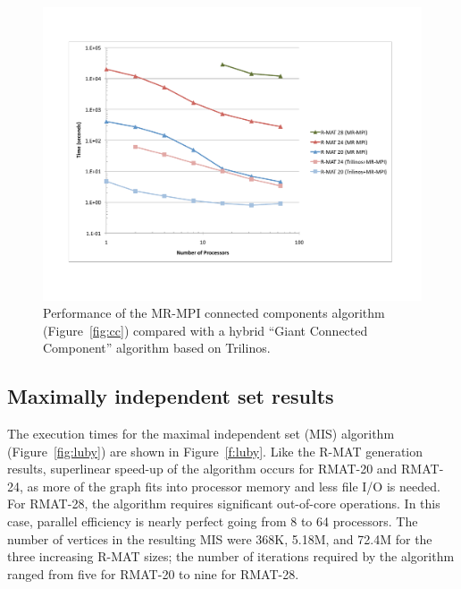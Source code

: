 \begin{figure}[htb]
\includegraphics[width=\textwidth]{fig_cc.pdf}
\caption{Performance of the MR-MPI connected components algorithm (Figure~\ref{fig:cc}) compared with a hybrid ``Giant Connected Component'' algorithm based
on Trilinos.}
\label{f:cc}
\end{figure}

\subsection{Maximally independent set results}

The execution times for the maximal independent set (MIS) algorithm
(Figure~\ref{fig:luby}) are shown in Figure~\ref{f:luby}.  Like the
R-MAT generation results, superlinear speed-up of the algorithm occurs
for RMAT-20 and RMAT-24, as more of the graph fits into processor
memory and less file I/O is needed.  For RMAT-28, the algorithm
requires significant out-of-core operations. In this case, parallel
efficiency is nearly perfect going from 8 to 64 processors.  The
number of vertices in the resulting MIS were 368K, 5.18M, and 72.4M
for the three
increasing R-MAT sizes; the number of iterations required by the
algorithm ranged from five for RMAT-20 to nine for RMAT-28.

